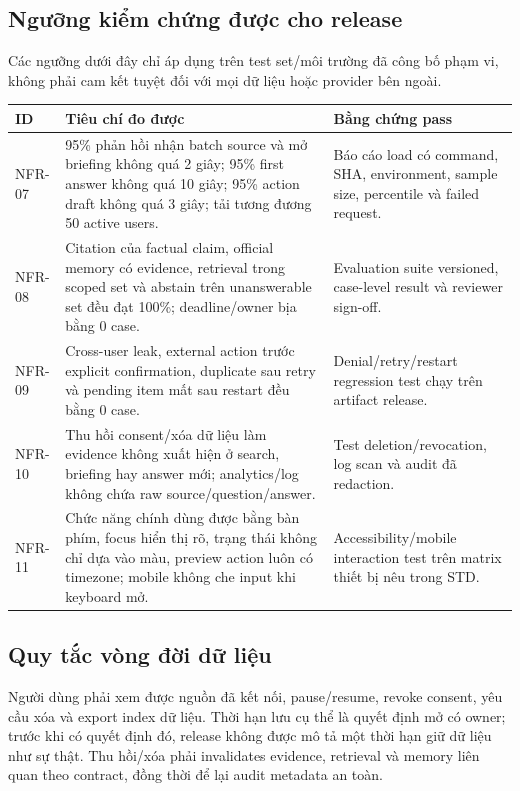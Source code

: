 \documentclass[11pt,a4paper]{article}
\begin{document}
\subsection{Ngưỡng kiểm chứng được cho release}
Các ngưỡng dưới đây chỉ áp dụng trên test set/môi trường đã công bố phạm vi, không phải cam kết tuyệt đối với mọi dữ liệu hoặc provider bên ngoài.
\begin{longtable}{p{1.8cm}p{5.2cm}p{6.8cm}}
\toprule ID & Tiêu chí đo được & Bằng chứng pass \\ \midrule\endhead
NFR-07 & 95\% phản hồi nhận batch source và mở briefing không quá 2 giây; 95\% first answer không quá 10 giây; 95\% action draft không quá 3 giây; tải tương đương 50 active users. & Báo cáo load có command, SHA, environment, sample size, percentile và failed request. \\
NFR-08 & Citation của factual claim, official memory có evidence, retrieval trong scoped set và abstain trên unanswerable set đều đạt 100\%; deadline/owner bịa bằng 0 case. & Evaluation suite versioned, case-level result và reviewer sign-off. \\
NFR-09 & Cross-user leak, external action trước explicit confirmation, duplicate sau retry và pending item mất sau restart đều bằng 0 case. & Denial/retry/restart regression test chạy trên artifact release. \\
NFR-10 & Thu hồi consent/xóa dữ liệu làm evidence không xuất hiện ở search, briefing hay answer mới; analytics/log không chứa raw source/question/answer. & Test deletion/revocation, log scan và audit đã redaction. \\
NFR-11 & Chức năng chính dùng được bằng bàn phím, focus hiển thị rõ, trạng thái không chỉ dựa vào màu, preview action luôn có timezone; mobile không che input khi keyboard mở. & Accessibility/mobile interaction test trên matrix thiết bị nêu trong STD. \\
\bottomrule
\end{longtable}

\subsection{Quy tắc vòng đời dữ liệu}
Người dùng phải xem được nguồn đã kết nối, pause/resume, revoke consent, yêu cầu xóa và export index dữ liệu. Thời hạn lưu cụ thể là quyết định mở có owner; trước khi có quyết định đó, release không được mô tả một thời hạn giữ dữ liệu như sự thật. Thu hồi/xóa phải invalidates evidence, retrieval và memory liên quan theo contract, đồng thời để lại audit metadata an toàn.
\end{document}
